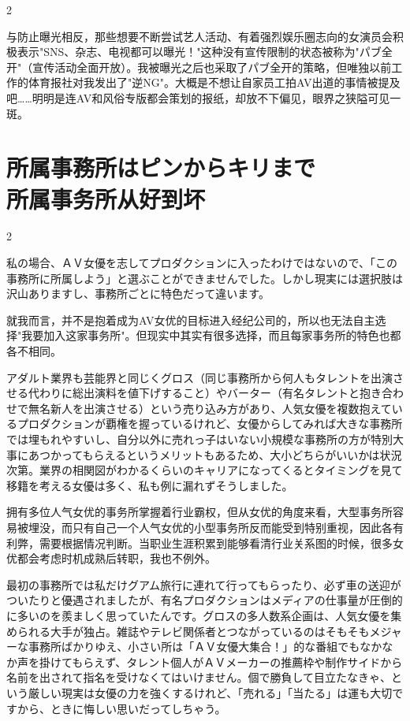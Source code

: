 \documentclass[12pt,UTF8]{ctexbook}
\begin{document}
\begin{paracol}{2}
\switchcolumn

与防止曝光相反，那些想要不断尝试艺人活动、有着强烈娱乐圈志向的女演员会积极表示"SNS、杂志、电视都可以曝光！"这种没有宣传限制的状态被称为"パブ全开"（宣传活动全面开放）。我被曝光之后也采取了パブ全开的策略，但唯独以前工作的体育报社对我发出了"逆NG"。大概是不想让自家员工拍AV出道的事情被提及吧……明明是连AV和风俗专版都会策划的报纸，却放不下偏见，眼界之狭隘可见一斑。

\end{paracol}

\section{所属事務所はピンからキリまで\\所属事务所从好到坏}

\begin{paracol}{2}

私の場合、ＡＶ女優を志してプロダクションに入ったわけではないので、「この事務所に所属しよう」と選ぶことができませんでした。しかし現実には選択肢は沢山ありますし、事務所ごとに特色だって違います。

\switchcolumn

就我而言，并不是抱着成为AV女优的目标进入经纪公司的，所以也无法自主选择"我要加入这家事务所"。但现实中其实有很多选择，而且每家事务所的特色也都各不相同。

\switchcolumn*

アダルト業界も芸能界と同じくグロス（同じ事務所から何人もタレントを出演させる代わりに総出演料を値下げすること）やバーター（有名タレントと抱き合わせで無名新人を出演させる）という売り込み方があり、人気女優を複数抱えているプロダクションが覇権を握っているけれど、女優からしてみれば大きな事務所では埋もれやすいし、自分以外に売れっ子はいない小規模な事務所の方が特別大事にあつかってもらえるというメリットもあるため、大小どちらがいいかは状況次第。業界の相関図がわかるくらいのキャリアになってくるとタイミングを見て移籍を考える女優は多く、私も例に漏れずそうしました。

\switchcolumn

拥有多位人气女优的事务所掌握着行业霸权，但从女优的角度来看，大型事务所容易被埋没，而只有自己一个人气女优的小型事务所反而能受到特别重视，因此各有利弊，需要根据情况判断。当职业生涯积累到能够看清行业关系图的时候，很多女优都会考虑时机成熟后转职，我也不例外。

\switchcolumn*

最初の事務所では私だけグアム旅行に連れて行ってもらったり、必ず車の送迎がついたりと優遇されましたが、有名プロダクションはメディアの仕事量が圧倒的に多いのを羨ましく思っていたんです。グロスの多人数系企画は、人気女優を集められる大手が独占。雑誌やテレビ関係者とつながっているのはそもそもメジャーな事務所ばかりゆえ、小さい所は「ＡＶ女優大集合！」的な番組でもなかなか声を掛けてもらえず、タレント個人がＡＶメーカーの推薦枠や制作サイドから名前を出されて指名を受けなくてはいけません。個で勝負して目立たなきゃ、という厳しい現実は女優の力を強くするけれど、「売れる」「当たる」は運も大切ですから、ときに悔しい思いだってしちゃう。


\end{paracol}
\end{document}
